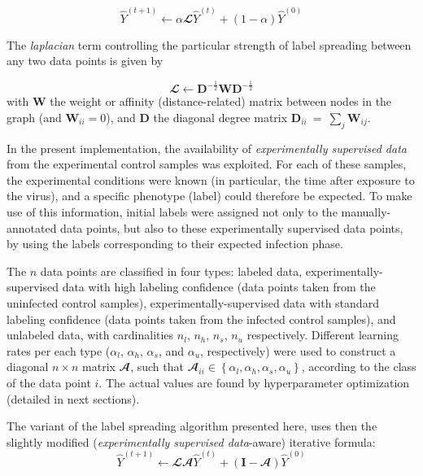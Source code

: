 \documentclass[oneside, a4paper, draft]{memoir} %
\begin{document}
\begin{equation}
	\label{eq:zhou}
	\hat{Y}^{(t+1)} \leftarrow \alpha \mathbfcal{L}\hat{Y}^{(t)} + (1-\alpha)\hat{Y}^{(0)}
\end{equation}

The \emph{laplacian} term controlling the particular
strength of label spreading between any two data points is given by

\begin{equation}
\label{eq:laplacian}
\mathbfcal{L} \leftarrow \mathbf{D}^{-\frac 1 2}\mathbf{W}\mathbf{D}^{-\frac 1 2}
\end{equation}
with $\mathbf{W}$ the
weight or affinity (distance-related) matrix between nodes in the graph (and $\mathbf{W}_{ii} = 0$), and
$\mathbf{D}$ the diagonal degree matrix $\mathbf{D}_{ii}~=~\sum_{j}{\mathbf{W}_{ij}}$. 

In the present implementation, the availability of \emph{experimentally supervised data} from the experimental control
samples was exploited. For each of these samples, the experimental conditions were known (in particular, the time after
exposure to the virus), and a specific phenotype (label) could therefore be expected. To make use of this information,
initial labels were assigned not only to the manually-annotated data points, but also to these experimentally
supervised data points, by using the labels corresponding to their expected infection phase.

The $n$ data points are classified in four types: labeled data,
experimentally-supervised data with high labeling confidence (data points taken from the uninfected control samples), 
experimentally-supervised data with standard labeling confidence (data points taken from the infected control
samples), and unlabeled data, with cardinalities $n_l$, $n_h$, $n_s$, $n_u$ respectively. Different learning rates
per each type ($\alpha_l$, $\alpha_h$, $\alpha_s$, and $\alpha_u$, respectively) were used to construct a diagonal
$n \times n$ matrix $\mathbfcal{A}$, such that $\mathbfcal{A}_{ii} \in \left\{ \alpha_l, \alpha_h, \alpha_s,
\alpha_u \right\}$, according to the class of the data point $i$. The actual values are found by hyperparameter
optimization (detailed in next sections).

The variant of the label spreading algorithm presented here, uses then the slightly modified (\emph{experimentally
supervised data}-aware) iterative formula:
\begin{equation}
	\hat{Y}^{(t+1)} \leftarrow \mathbfcal{LA}\hat{Y}^{(t)} + (\mathbf{I}-\mathbfcal{A})\hat{Y}^{(0)}
\end{equation}
\end{document}
